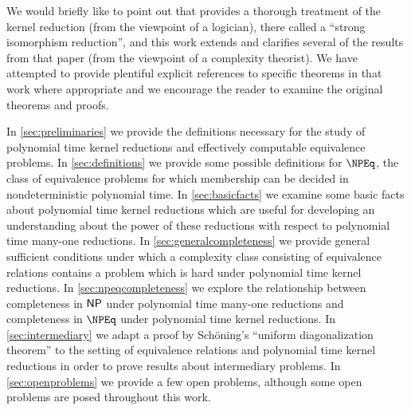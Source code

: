 We would briefly like to point out that \cite{bcffm} provides a thorough treatment of the kernel reduction (from the viewpoint of a logician), there called a ``strong isomorphism reduction'', and this work extends and clarifies several of the results from that paper (from the viewpoint of a complexity theorist).
We have attempted to provide plentiful explicit references to specific theorems in that work where appropriate and we encourage the reader to examine the original theorems and proofs.

In \autoref{sec:preliminaries} we provide the definitions necessary for the study of polynomial time kernel reductions and effectively computable equivalence problems.
In \autoref{sec:definitions} we provide some possible definitions for $\NPEq$, the class of equivalence problems for which membership can be decided in nondeterministic polynomial time.
In \autoref{sec:basicfacts} we examine some basic facts about polynomial time kernel reductions which are useful for developing an understanding about the power of these reductions with respect to polynomial time many-one reductions.
In \autoref{sec:generalcompleteness} we provide general sufficient conditions under which a complexity class consisting of equivalence relations contains a problem which is hard under polynomial time kernel reductions.
In \autoref{sec:npeqcompleteness} we explore the relationship between completeness in ${\mathsf{NP}}$ under polynomial time many-one reductions and completeness in $\NPEq$ under polynomial time kernel reductions.
In \autoref{sec:intermediary} we adapt a proof by Sch\"{o}ning's ``uniform diagonalization theorem'' to the setting of equivalence relations and polynomial time kernel reductions in order to prove results about intermediary problems.
In \autoref{sec:openproblems} we provide a few open problems, although some open problems are posed throughout this work.
